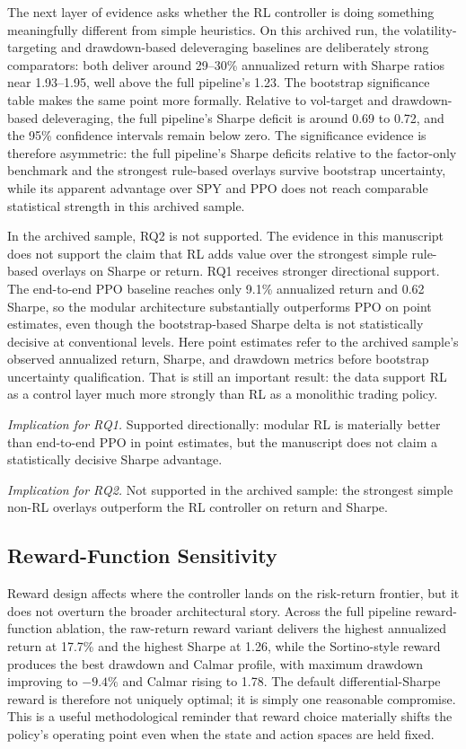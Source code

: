 \documentclass[11pt]{article}
\begin{document}
The next layer of evidence asks whether the RL controller is doing something
meaningfully different from simple heuristics. On this archived run, the
volatility-targeting and drawdown-based deleveraging baselines are deliberately
strong comparators: both deliver around 29--30\% annualized return with Sharpe
ratios near 1.93--1.95, well above the full pipeline's 1.23. The bootstrap
significance table makes the same point more formally. Relative to vol-target
and drawdown-based deleveraging, the full pipeline's Sharpe deficit is around
0.69 to 0.72, and the 95\% confidence intervals remain below zero. The
significance evidence is therefore asymmetric: the full pipeline's Sharpe
deficits relative to the factor-only benchmark and the strongest rule-based
overlays survive bootstrap uncertainty, while its apparent advantage over SPY
and PPO does not reach comparable statistical strength in this archived sample.

In the archived sample, RQ2 is not supported. The evidence in this manuscript
does not support the claim that RL adds value over the strongest simple
rule-based overlays on Sharpe or return. RQ1 receives stronger directional
support. The end-to-end PPO baseline reaches only 9.1\% annualized return and
0.62 Sharpe, so the modular architecture substantially outperforms PPO on point
estimates, even though the bootstrap-based Sharpe delta is not statistically
decisive at conventional levels. Here point estimates refer to the archived
sample's observed annualized return, Sharpe, and drawdown metrics before
bootstrap uncertainty qualification. That is still an important result: the data
support RL as a control layer much more strongly than RL as a monolithic
trading policy.

\noindent\textit{Implication for RQ1.} Supported directionally: modular RL is
materially better than end-to-end PPO in point estimates, but the manuscript
does not claim a statistically decisive Sharpe advantage.

\noindent\textit{Implication for RQ2.} Not supported in the archived sample: the
strongest simple non-RL overlays outperform the RL controller on return and
Sharpe.

\subsection{Reward-Function Sensitivity}

Reward design affects where the controller lands on the risk-return frontier,
but it does not overturn the broader architectural story. Across the full
pipeline reward-function ablation, the raw-return reward variant delivers the
highest annualized return at 17.7\% and the highest Sharpe at 1.26, while the
Sortino-style reward produces the best drawdown and Calmar profile, with
maximum drawdown improving to $-9.4\%$ and Calmar rising to 1.78. The default
differential-Sharpe reward is therefore not uniquely optimal; it is simply one
reasonable compromise. This is a useful methodological reminder that reward
choice materially shifts the policy's operating point even when the state and
action spaces are held fixed.
\end{document}
